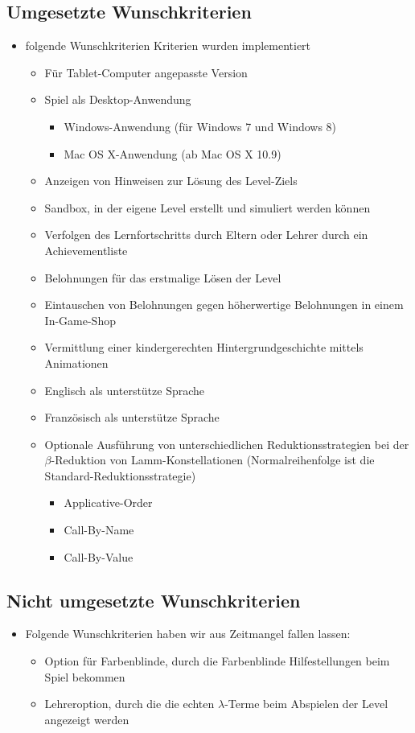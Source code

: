 \subsection{Umgesetzte Wunschkriterien}
\begin{itemize}
\item folgende Wunschkriterien Kriterien wurden implementiert 
\begin{itemize}
\item Für Tablet-Computer angepasste Version
	\item Spiel als Desktop-Anwendung
	\begin{itemize}
		\item Windows-Anwendung (für Windows 7 und Windows 8)
		\item Mac OS X-Anwendung (ab Mac OS X 10.9)
	\end{itemize}
	\item Anzeigen von Hinweisen zur Lösung des Level-Ziels
	\item Sandbox, in der eigene Level erstellt und simuliert werden können
	\item Verfolgen des Lernfortschritts durch Eltern oder Lehrer durch ein Achievementliste
	\item Belohnungen für das erstmalige Lösen der Level
	\item Eintauschen von Belohnungen gegen höherwertige Belohnungen in einem In-Game-Shop
	
	
	\item Vermittlung einer kindergerechten Hintergrundgeschichte mittels Animationen
	\item Englisch als unterstütze Sprache
	\item Französisch als unterstütze Sprache
	\item Optionale Ausführung von unterschiedlichen Reduktionsstrategien bei der $\beta$-Reduktion von Lamm-Konstellationen (Normalreihenfolge ist die Standard-Reduktionsstrategie)
	
	\begin{itemize}
		\item Applicative-Order
		\item Call-By-Name
		\item Call-By-Value
	\end{itemize}
	\end{itemize}
\end{itemize}


\subsection{Nicht umgesetzte Wunschkriterien}
\begin{itemize}
\item Folgende Wunschkriterien haben wir aus Zeitmangel fallen lassen:
\begin{itemize}
\item Option für Farbenblinde, durch die Farbenblinde Hilfestellungen beim Spiel bekommen
\item Lehreroption, durch die die echten $\lambda$-Terme beim Abspielen der Level angezeigt werden
\end{itemize}
\end{itemize}
